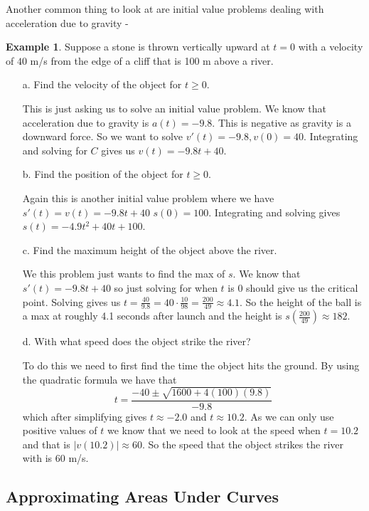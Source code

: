\documentclass[12pt,reqno]{article}
\theoremstyle{definition}
\newtheorem*{Example}{Example}
\begin{document}
Another common thing to look at are initial value problems dealing with acceleration due to gravity - 
\begin{Example}
	Suppose a stone is thrown vertically upward at $t = 0$ with a velocity of $40$ m/s from the edge of a cliff that is 100 m above a river. 
	\begin{enumerate}
		\item[a.] Find the velocity of the object for $t \geq 0$. 
		
		This is just asking us to solve an initial value problem. We know that acceleration due to gravity is $a(t) = -9.8$. This is negative as gravity is a downward force. So we want to solve $v'(t) = -9.8, v(0) = 40$. Integrating and solving for $C$ gives us $v(t) = -9.8t + 40$. 
		
		\item[b.] Find the position of the object for $t \geq 0$. 
		
		Again this is another initial value problem where we have $s'(t) = v(t) = -9.8t + 40$ $s(0) = 100$. Integrating and solving gives $s(t)= -4.9 t^2 + 40t + 100$. 
		\item[c.] Find the maximum height of the object above the river. 
		
		We this problem just wants to find the max of $s$. We know that $s'(t) = -9.8t + 40$ so just solving for when $t$ is 0 should give us the critical point. Solving gives us $t = \frac{40}{9.8} = 40 \cdot \frac{10}{98} = \frac{200}{49} \approx 4.1$. So the height of the ball is a max at roughly 4.1 seconds after launch and the height is $s(\frac{200}{49}) \approx 182$. 
		
		\item[d.] With what speed does the object strike the river? 
		
		To do this we need to first find the time the object hits the ground. By using the quadratic formula we have that $$ t = \frac{-40 \pm \sqrt{1600 + 4(100)(9.8)}}{-9.8}$$ which after simplifying gives $t \approx -2.0$ and $t \approx 10.2$. As we can only use positive values of $t$ we know that we need to look at the speed when $t = 10.2$ and that is $|v(10.2)| \approx 60$. So the speed that the object strikes the river with is 60 m/s. 
	\end{enumerate}
\end{Example}

\subsection{Approximating Areas Under Curves}
\end{document}
